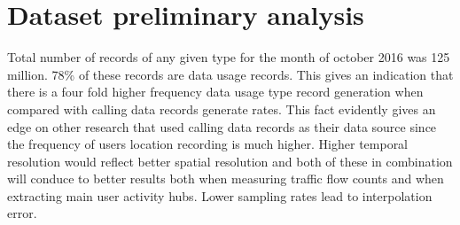 \documentclass[12pt, a4paper]{report}
\theoremstyle{definition}
\theoremstyle{definition}%
\theoremstyle{definition}%
\theoremstyle{definition}%
\theoremstyle{definition}%
\theoremstyle{definition}%
\begin{document}

\begin{table}[h]
    \label{table:dataset_01}
	\centering
\caption{Data Dictionary of mobile usage raw dataset} 
\end{table}


\section{Dataset preliminary analysis} \label{section:methodology:data_set_preliminary_analysis}

Total number of records of any given type for the month of october 2016 was 125 million. 78\% of these records are data usage records. This gives an indication that there is a four fold higher frequency data usage type record generation when compared with calling data records generate rates. This fact evidently gives an edge on other research that used calling data records as their data source since the frequency of users location recording is much higher. Higher temporal resolution would reflect better spatial resolution and both of these in combination will conduce to better results both when measuring traffic flow counts and when extracting main user activity hubs. Lower sampling rates lead to interpolation error. 
\end{document}
